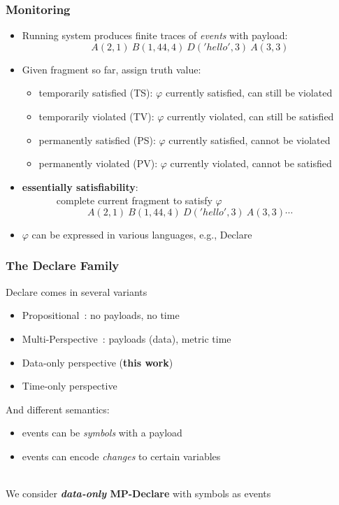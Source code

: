 \documentclass{beamer}
\begin{document}
\begin{frame}
\frametitle{Monitoring}

\begin{itemize}
	\item Running system produces finite traces of \emph{events} with payload: 
	$$A(2,1)~B(1,44,4)~D('hello',3)~A(3,3)$$ 

	\item Given fragment so far, assign truth value:
		\begin{itemize}
			\item temporarily satisfied (TS): $\varphi$ currently satisfied, can still be violated
			\item temporarily violated (TV): $\varphi$ currently violated, can still be satisfied
			\item permanently satisfied (PS): $\varphi$ currently satisfied, cannot be violated
			\item permanently violated (PV): $\varphi$ currently violated, cannot be satisfied
		\end{itemize}	
		
	\item  {\bf essentially satisfiability}:\\ 
	~~~~~~~complete current fragment to satisfy $\varphi$
		$$A(2,1)~B(1,44,4)~D('hello',3)~A(3,3)\cdots$$ 

	\item $\varphi$ can be expressed in various languages, e.g., Declare
\end{itemize}

\end{frame}



\begin{frame}
\frametitle{The Declare Family}

Declare comes in several variants

\begin{itemize}
	\item Propositional~\cite{}: no payloads, no time
	\item Multi-Perspective~\cite{}: payloads (data), metric time
	\item Data-only perspective ({\bf this work})
	\item Time-only perspective
\end{itemize}

And different semantics:
\begin{itemize}
	\item events can be \emph{symbols} with a payload
	\item events can encode \emph{changes} to certain variables
\end{itemize}

~\\

We consider {\bf \emph{data-only} MP-Declare} with symbols as events

\end{frame}
\end{document}
